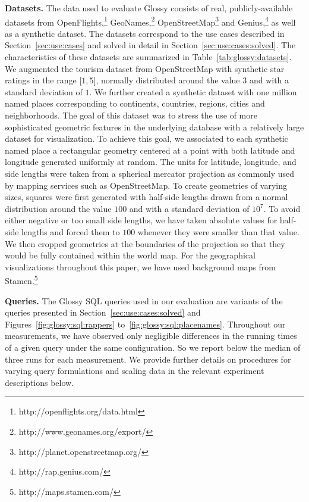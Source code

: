 \documentclass[11pt, oneside]{report}
\newcommand{\minisec}[1]{\noindent\textbf{#1.}}
\begin{document}
{\minisec{Datasets}
The data used to evaluate Glossy consists of real, publicly-available datasets from OpenFlights,\footnote{http://openflights.org/data.html} GeoNames,\footnote{http://www.geonames.org/export/} OpenStreetMap\footnote{http://planet.openstreetmap.org/} and Genius,\footnote{http://rap.genius.com/} as well as a synthetic dataset. The datasets correspond to the use cases described in Section~\ref{sec:use:cases} and solved in detail in Section~\ref{sec:use:cases:solved}. The characteristics of these datasets are summarized in Table~\ref{tab:glossy:datasets}. We augmented the tourism dataset from OpenStreetMap with synthetic star ratings in the range $\lbrack 1, 5 \rbrack$, normally distributed around the value $3$ and with a standard deviation of $1$.  We further created a synthetic dataset with one million named places corresponding to continents, countries, regions, cities and neighborhoods. The goal of this dataset was to stress the use of more sophisticated geometric features in the underlying database with a relatively large dataset for visualization. To achieve this goal, we associated to each synthetic named place a rectangular geometry centered at a point with both latitude and longitude generated uniformly at random. The units for latitude, longitude, and side lengths were taken from a spherical mercator projection as commonly used by mapping services such as OpenStreetMap. To create geometries of varying sizes, squares were first generated with half-side lengths drawn from a normal distribution around the value $100$ and with a standard deviation of $10^7$. To avoid either negative or too small side lengths, we have taken absolute values for half-side lengths and forced them to $100$ whenever they were smaller than that value. We then cropped geometries at the boundaries of the projection so that they would be fully contained within the world map. For the geographical visualizations throughout this paper, we have used background maps from Stamen.\footnote{http://maps.stamen.com/}

\minisec{Queries}
The Glossy SQL queries used in our evaluation are variants of the queries presented in Section~\ref{sec:use:cases:solved} and Figures~\ref{fig:glossy:sql:rappers} to~\ref{fig:glossy:sql:placenames}. Throughout our measurements, we have observed only negligible differences in the running times of a given query under the same configuration. So we report below the median of three runs for each measurement. We provide further details on procedures for varying query formulations and scaling data in the relevant experiment descriptions below.  

}
\end{document}
